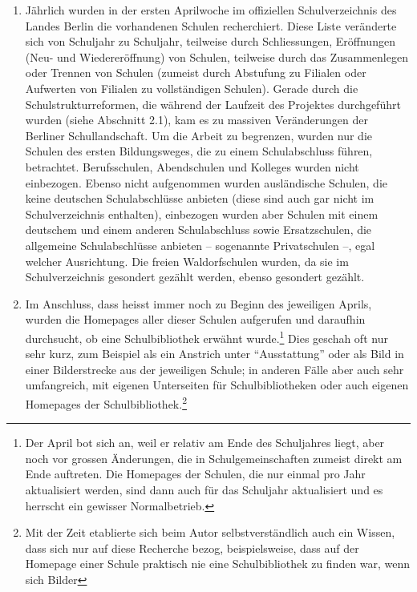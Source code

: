 \documentclass[a4paper,
fontsize=11pt,
oneside,
numbers=noperiodatend,
parskip=half-,
bibliography=totoc,
final
]{scrartcl}
\begin{document}
\begin{enumerate}
\def\labelenumi{\arabic{enumi}.}
\item
  Jährlich wurden in der ersten Aprilwoche im offiziellen
  Schulverzeichnis des Landes Berlin die vorhandenen Schulen
  recherchiert. Diese Liste veränderte sich von Schuljahr zu Schuljahr,
  teilweise durch Schliessungen, Eröffnungen (Neu- und Wiedereröffnung)
  von Schulen, teilweise durch das Zusammenlegen oder Trennen von
  Schulen (zumeist durch Abstufung zu Filialen oder Aufwerten von
  Filialen zu vollständigen Schulen). Gerade durch die
  Schulstrukturreformen, die während der Laufzeit des Projektes
  durchgeführt wurden (siehe Abschnitt 2.1), kam es zu massiven
  Veränderungen der Berliner Schullandschaft. Um die Arbeit zu
  begrenzen, wurden nur die Schulen des ersten Bildungsweges, die zu
  einem Schulabschluss führen, betrachtet. Berufsschulen, Abendschulen
  und Kolleges wurden nicht einbezogen. Ebenso nicht aufgenommen wurden
  ausländische Schulen, die keine deutschen Schulabschlüsse anbieten
  (diese sind auch gar nicht im Schulverzeichnis enthalten), einbezogen
  wurden aber Schulen mit einem deutschem und einem anderen
  Schulabschluss sowie Ersatzschulen, die allgemeine Schulabschlüsse
  anbieten -- sogenannte Privatschulen --, egal welcher Ausrichtung. Die
  freien Waldorfschulen wurden, da sie im Schulverzeichnis gesondert
  gezählt werden, ebenso gesondert gezählt.
\item
  Im Anschluss, dass heisst immer noch zu Beginn des jeweiligen Aprils,
  wurden die Homepages aller dieser Schulen aufgerufen und daraufhin
  durchsucht, ob eine Schulbibliothek erwähnt wurde.\footnote{Der April
    bot sich an, weil er relativ am Ende des Schuljahres liegt, aber
    noch vor grossen Änderungen, die in Schulgemeinschaften zumeist
    direkt am Ende auftreten. Die Homepages der Schulen, die nur einmal
    pro Jahr aktualisiert werden, sind dann auch für das Schuljahr
    aktualisiert und es herrscht ein gewisser Normalbetrieb.} Dies
  geschah oft nur sehr kurz, zum Beispiel als ein Anstrich unter
  \enquote{Ausstattung} oder als Bild in einer Bilderstrecke aus der
  jeweiligen Schule; in anderen Fälle aber auch sehr umfangreich, mit
  eigenen Unterseiten für Schulbibliotheken oder auch eigenen Homepages
  der Schulbibliothek.\footnote{Mit der Zeit etablierte sich beim Autor
    selbstverständlich auch ein Wissen, dass sich nur auf diese
    Recherche bezog, beispielsweise, dass auf der Homepage einer Schule
    praktisch nie eine Schulbibliothek zu finden war, wenn sich Bilder
}
\end{enumerate}
\end{document}
